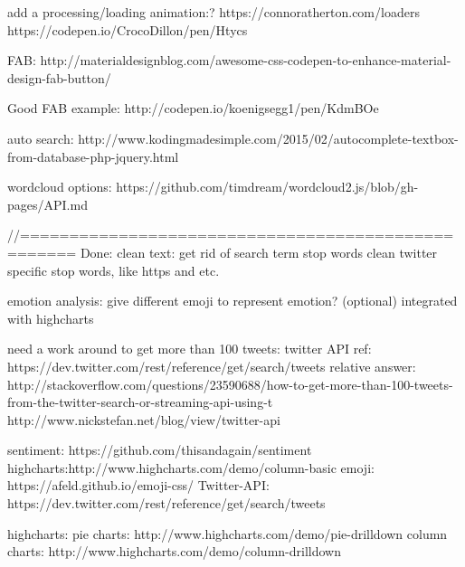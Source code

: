 add a processing/loading animation:?
https://connoratherton.com/loaders
https://codepen.io/CrocoDillon/pen/Htycs

FAB:
http://materialdesignblog.com/awesome-css-codepen-to-enhance-material-design-fab-button/

Good FAB example:
http://codepen.io/koenigsegg1/pen/KdmBOe


auto search:
http://www.kodingmadesimple.com/2015/02/autocomplete-textbox-from-database-php-jquery.html

wordcloud options:
https://github.com/timdream/wordcloud2.js/blob/gh-pages/API.md


//===================================================
Done:
clean text:
get rid of search term
stop words
clean twitter specific stop words, like https and etc.

emotion analysis:
give different emoji to represent emotion? (optional)
integrated with highcharts

need a work around to get more than 100 tweets:
twitter API ref: https://dev.twitter.com/rest/reference/get/search/tweets
relative answer: http://stackoverflow.com/questions/23590688/how-to-get-more-than-100-tweets-from-the-twitter-search-or-streaming-api-using-t
http://www.nickstefan.net/blog/view/twitter-api


sentiment: https://github.com/thisandagain/sentiment
highcharts:http://www.highcharts.com/demo/column-basic
emoji: https://afeld.github.io/emoji-css/
Twitter-API: https://dev.twitter.com/rest/reference/get/search/tweets

highcharts:
pie charts:  http://www.highcharts.com/demo/pie-drilldown
column charts: http://www.highcharts.com/demo/column-drilldown
